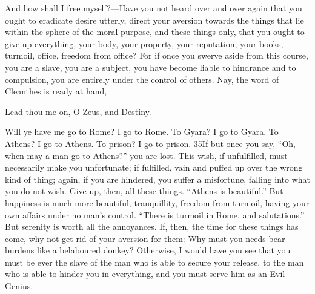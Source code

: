 And how shall I free myself?—Have you not heard over and over again that you ought to eradicate desire utterly, direct your aversion towards the things that lie within the sphere of the moral purpose, and these things only, that you ought to give up everything, your body, your property, your reputation, your books, turmoil, office, freedom from office? For if once you swerve aside from this course, you are a slave, you are a subject, you have become liable to hindrance and to compulsion, you are entirely under the control of others. Nay, the word of Cleanthes is ready at hand,

Lead thou me on, O Zeus, and Destiny.

Will ye have me go to Rome? I go to Rome. To Gyara? I go to Gyara. To Athens? I go to Athens. To prison? I go to prison. 35If but once you say, ``Oh, when may a man go to Athens?'' you are lost. This wish, if unfulfilled, must necessarily make you unfortunate; if fulfilled, vain and puffed up over the wrong kind of thing; again, if you are hindered, you suffer a misfortune, falling into what you do not wish. Give up, then, all these things. ``Athens is beautiful.'' But happiness is much more beautiful, tranquillity, freedom from turmoil, having your own affairs under no man's control. ``There is turmoil in Rome, and salutations.'' But serenity is worth all the annoyances. If, then, the time for these things has come, why not get rid of your aversion for them: Why must you needs bear burdens like a belaboured donkey? Otherwise, I would have you see that you must be ever the slave of the man who is able to secure your release, to the man who is able to hinder you in everything, and you must serve him as an Evil Genius.

